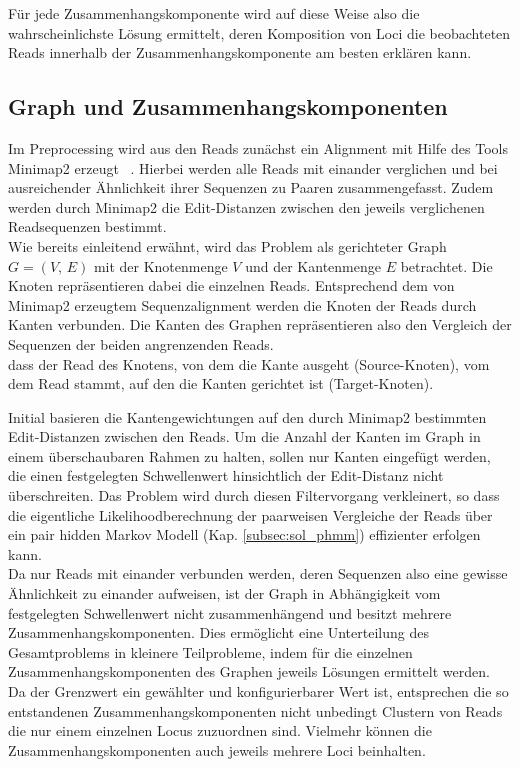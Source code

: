 Für jede Zusammenhangskomponente wird auf diese Weise also die wahrscheinlichste Lösung ermittelt, deren Komposition von Loci die beobachteten Reads innerhalb der Zusammenhangskomponente am besten erklären kann. \\


\subsection{Graph und Zusammenhangskomponenten} \label{subsec:sol_graph}

Im Preprocessing wird aus den Reads zunächst ein Alignment mit Hilfe des Tools Minimap2  erzeugt ~\cite{li_2018}. Hierbei werden alle Reads mit einander verglichen und bei ausreichender Ähnlichkeit ihrer Sequenzen zu Paaren zusammengefasst. Zudem werden durch Minimap2 die Edit-Distanzen zwischen den jeweils verglichenen Readsequenzen bestimmt. \\

Wie bereits einleitend erwähnt, wird das Problem als gerichteter Graph $G=(V, \, E)$ mit der Knotenmenge $V$ und der Kantenmenge $E$ betrachtet. Die Knoten repräsentieren dabei die einzelnen Reads. Entsprechend dem von Minimap2 erzeugtem Sequenzalignment werden die Knoten der Reads durch Kanten verbunden. Die Kanten des Graphen repräsentieren also den Vergleich der Sequenzen der beiden angrenzenden Reads.\\dass der Read des Knotens, von dem die Kante ausgeht (Source-Knoten), vom dem Read stammt, auf den die Kanten gerichtet ist (Target-Knoten).

Initial basieren die Kantengewichtungen auf den durch Minimap2 bestimmten Edit-Distanzen zwischen den Reads. Um die Anzahl der Kanten im Graph in einem überschaubaren Rahmen zu halten, sollen nur Kanten eingefügt werden, die einen festgelegten Schwellenwert hinsichtlich der Edit-Distanz nicht überschreiten. Das Problem wird durch diesen Filtervorgang verkleinert, so dass die eigentliche Likelihoodberechnung der paarweisen Vergleiche der Reads über ein pair hidden Markov Modell (Kap. \ref{subsec:sol_phmm}) effizienter erfolgen kann. \\

Da nur Reads mit einander verbunden werden, deren Sequenzen also eine gewisse Ähnlichkeit zu einander aufweisen, ist der Graph in Abhängigkeit vom festgelegten Schwellenwert nicht zusammenhängend und besitzt mehrere Zusammenhangskomponenten. Dies ermöglicht eine Unterteilung des Gesamtproblems in kleinere Teilprobleme, indem für die einzelnen Zusammenhangskomponenten des Graphen jeweils Lösungen ermittelt werden. Da der Grenzwert ein gewählter und konfigurierbarer Wert ist, entsprechen die so entstandenen Zusammenhangskomponenten nicht unbedingt Clustern von Reads die nur einem einzelnen Locus zuzuordnen sind. Vielmehr können die Zusammenhangskomponenten auch jeweils mehrere Loci beinhalten. 


